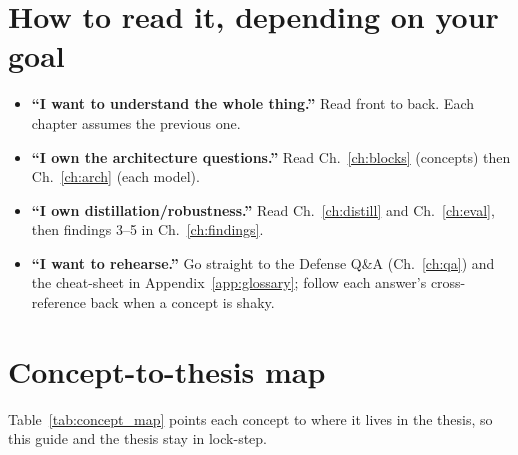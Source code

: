 \section*{How to read it, depending on your goal}

\begin{itemize}[leftmargin=1.4em]
  \item \textbf{``I want to understand the whole thing.''} Read front to back. Each chapter assumes
  the previous one.
  \item \textbf{``I own the architecture questions.''} Read Ch.~\ref{ch:blocks} (concepts) then
  Ch.~\ref{ch:arch} (each model).
  \item \textbf{``I own distillation/robustness.''} Read Ch.~\ref{ch:distill} and Ch.~\ref{ch:eval},
  then findings 3--5 in Ch.~\ref{ch:findings}.
  \item \textbf{``I want to rehearse.''} Go straight to the Defense Q\&A (Ch.~\ref{ch:qa}) and the
  cheat-sheet in Appendix~\ref{app:glossary}; follow each answer's cross-reference back when a concept
  is shaky.
\end{itemize}

\section*{Concept-to-thesis map}

Table~\ref{tab:concept_map} points each concept to where it lives in the thesis, so this guide and the
thesis stay in lock-step.

